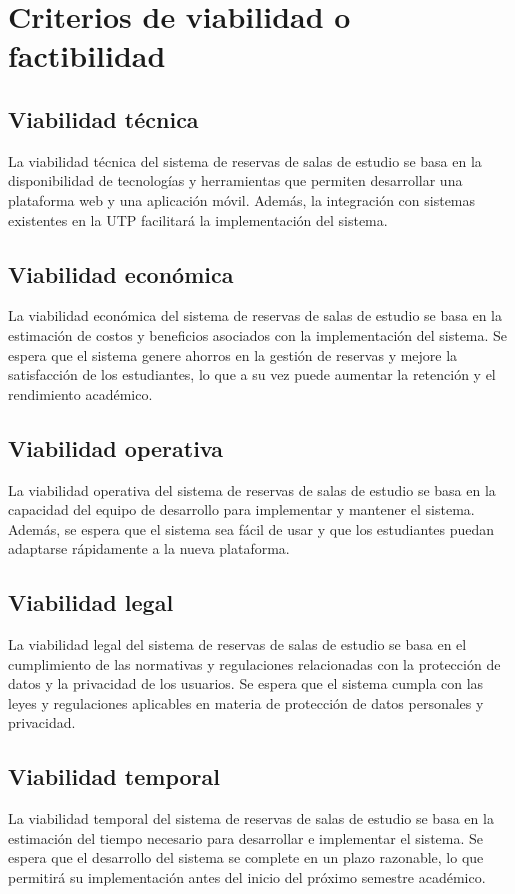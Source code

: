 \documentclass{article}
\begin{document}
      \section{Criterios de viabilidad o factibilidad}

      \subsection{Viabilidad técnica}

      La viabilidad técnica del sistema de reservas de salas de estudio se basa en la disponibilidad de tecnologías y herramientas que permiten desarrollar una plataforma web y una aplicación móvil. Además, la integración con sistemas existentes en la UTP facilitará la implementación del sistema.
      \subsection{Viabilidad económica}
      La viabilidad económica del sistema de reservas de salas de estudio se basa en la estimación de costos y beneficios asociados con la implementación del sistema. Se espera que el sistema genere ahorros en la gestión de reservas y mejore la satisfacción de los estudiantes, lo que a su vez puede aumentar la retención y el rendimiento académico.
      \subsection{Viabilidad operativa}
      La viabilidad operativa del sistema de reservas de salas de estudio se basa en la capacidad del equipo de desarrollo para implementar y mantener el sistema. Además, se espera que el sistema sea fácil de usar y que los estudiantes puedan adaptarse rápidamente a la nueva plataforma.
      \subsection{Viabilidad legal}
      La viabilidad legal del sistema de reservas de salas de estudio se basa en el cumplimiento de las normativas y regulaciones relacionadas con la protección de datos y la privacidad de los usuarios. Se espera que el sistema cumpla con las leyes y regulaciones aplicables en materia de protección de datos personales y privacidad.
      \subsection{Viabilidad temporal}
      La viabilidad temporal del sistema de reservas de salas de estudio se basa en la estimación del tiempo necesario para desarrollar e implementar el sistema. Se espera que el desarrollo del sistema se complete en un plazo razonable, lo que permitirá su implementación antes del inicio del próximo semestre académico.
\end{document}
